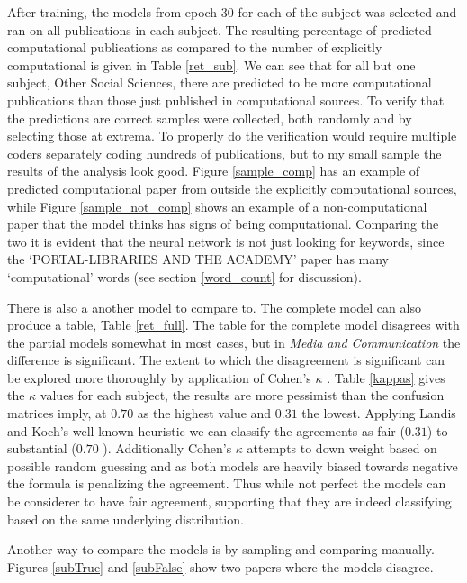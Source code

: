 \documentclass[12pt, a4paper]{article}
\begin{document}
After training, the models from epoch 30 for each of the subject was selected and ran on all publications in each subject. The resulting percentage of predicted computational publications as compared to the number of explicitly computational is given in Table \ref{ret_sub}. We can see that for all but one subject, Other Social Sciences, there are predicted to be more computational publications than those just published in computational sources. To verify that the predictions are correct samples were collected, both randomly and by selecting those at extrema. To properly do the verification would require multiple coders separately coding hundreds of publications, but to my small sample the results of the analysis look good. Figure \ref{sample_comp} has an example of predicted computational paper from outside the explicitly computational sources, while Figure \ref{sample_not_comp} shows an example of a non-computational paper that the model thinks has signs of being computational. Comparing the two it is evident that the neural network is not just looking for keywords, since the `PORTAL-LIBRARIES AND THE ACADEMY' paper has many `computational' words (see section \ref{word_count} for discussion).

There is also a another model to compare to. The complete model can also produce a table, Table \ref{ret_full}. The table for the complete model disagrees with the partial models somewhat in most cases, but in \textit{Media and Communication} the difference is significant. The extent to which the disagreement is significant can be explored more thoroughly by application of Cohen's $\kappa$ \citep{cohen1960coefficient}. Table \ref{kappas} gives the $\kappa$ values for each subject, the results are more pessimist than the confusion matrices imply, at $0.70$ as the highest value and $0.31$ the lowest. Applying Landis and Koch's well known heuristic \citep{landis1977measurement} we can classify the agreements as fair ($0.31$) to substantial ($0.70$ ). Additionally Cohen's $\kappa$ attempts to down weight based on possible random guessing and as both models are heavily biased towards negative the formula is penalizing the agreement. Thus while not perfect the models can be considerer to have fair agreement, supporting that they are indeed classifying based on the same underlying distribution.

Another way to compare the models is by sampling and comparing manually. Figures \ref{subTrue} and \ref{subFalse} show two papers where the models disagree.
\end{document}
